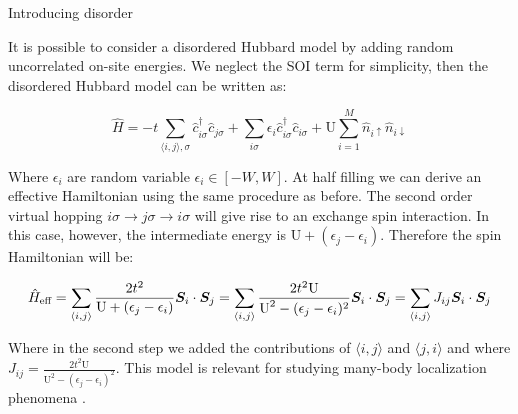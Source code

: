 \begin{subsection}{Introducing disorder}

It is possible to consider a disordered Hubbard model by adding random uncorrelated on-site energies. We neglect the SOI term for simplicity, then the disordered Hubbard model can be written as:

\begin{equation}
\label{DisorderedHubbardModel}
\hat{H} = -t\sum_{\langle i,j \rangle, \sigma} \hat{c}_{i \sigma}^\dagger \hat{c}_{j \sigma} +
\sum_{i \sigma} \epsilon_i \hat{c}_{i \sigma}^\dagger \hat{c}_{i \sigma} + \text{U} \sum_{i=1}^M \hat{n}_{i\uparrow}\hat{n}_{i\downarrow}
\end{equation}

Where $\epsilon_i$ are random variable $\epsilon_i \in [-W,W]$. At half filling we can derive an effective Hamiltonian using the same procedure as before. The second order virtual hopping $i\sigma \rightarrow j\sigma \rightarrow i\sigma$ will give rise to an exchange spin interaction. In this case, however, the intermediate energy is $\text{U} + (\epsilon_j - \epsilon_i)$. Therefore the spin Hamiltonian will be:

\begin{equation}
\hat{H}_{\text{eff}} = \sum_{\langle i,j \rangle} \frac{2t^2}{\text{U} + (\epsilon_j - \epsilon_i)} \boldsymbol{S}_i\cdot\boldsymbol{S}_j = \sum_{\langle i,j \rangle} \frac{2t^2\text{U}}{\text{U}^2-(\epsilon_j-\epsilon_i)^2} \boldsymbol{S}_i\cdot\boldsymbol{S}_j = \sum_{\langle i,j \rangle} J_{ij} \boldsymbol{S}_i\cdot\boldsymbol{S}_j
\end{equation}

Where in the second step we added the contributions of $\langle i,j \rangle$ and $\langle j,i \rangle$ and where $J_{ij} = \frac{2t^2\text{U}}{\text{U}^2-(\epsilon_j-\epsilon_i)^2}$. This model is relevant for studying many-body localization phenomena \cite{Protopopov2018}.

\end{subsection}

